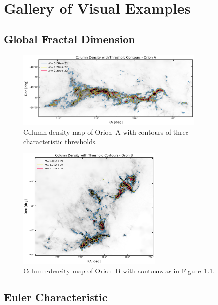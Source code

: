 \chapter{Gallery of Visual Examples}
\label{appendix:gallery}

\section{Global Fractal Dimension}

\begin{figure}[h]
    \centering
    \includegraphics[width=0.83\textwidth]{figures/Orion_A_gallery_global.png}
    \caption{Column-density map of Orion~A with contours of three characteristic thresholds.}
    \label{fig:gallery_global_thresholds_OA}
\end{figure}

\begin{figure}[h]
    \centering
    \includegraphics[width=0.64\textwidth]{figures/Orion_B_gallery_global.png}
    \caption{Column-density map of Orion~B with contours as in Figure~\ref{fig:gallery_global_thresholds_OA}.}
    \label{fig:gallery_global_thresholds_OB}
\end{figure}

\section{Euler Characteristic}

